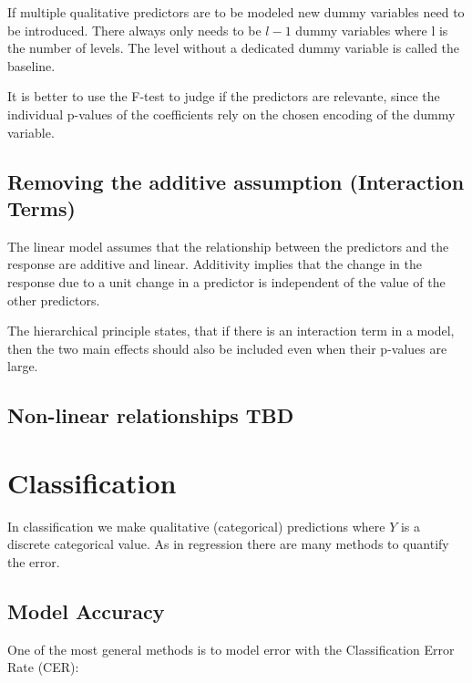 \documentclass[../Main.tex]{subfiles}
\begin{document}
If multiple qualitative predictors are to be modeled new dummy variables need to be introduced.
There always only needs to be \(l-1\) dummy variables where l is the number of levels. The level
without a dedicated dummy variable is called the baseline.

It is better to use the F-test to judge if the predictors are relevante,
since the individual p-values of the coefficients rely on the chosen encoding of the dummy variable. 

\subsection{Removing the additive assumption (Interaction Terms)}
The linear model assumes that the relationship between the predictors and the response are additive and linear.
Additivity implies that the change in the response due to a unit change in a predictor is independent of the value
of the other predictors.


The hierarchical principle states, that if there is an interaction 
term in a model, then the two main effects should also be 
included even when their p-values are large.

\subsection{Non-linear relationships TBD}

\newpage
\section{Classification}
In classification we make qualitative (categorical) predictions where \(Y\) is a discrete categorical value.
As in regression there are many methods to quantify the error.

\subsection{Model Accuracy}
One of the most general methods is to model error with the Classification Error Rate (CER):
\end{document}
